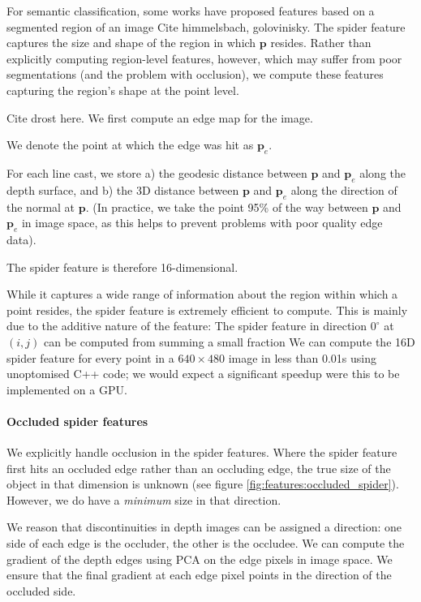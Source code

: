 \documentclass[10pt,twocolumn,letterpaper]{article}
\newcommand{\degree}{^{\circ}}
\newcommand{\point}{\mathbf{p}}
\begin{document}
For semantic classification, some works have proposed features based on a segmented region of an image
Cite himmelsbach, golovinisky.
The spider feature captures the size and shape of the region in which $\point$ resides. 
Rather than explicitly computing region-level features, however, which may suffer from poor segmentations (and the problem with occlusion), we compute these features capturing the region's shape at the point level. 

Cite drost here.
We first compute an edge map for the image.

We denote the point at which the edge was hit as $\point_{e}$.

For each line cast, we store
a) the geodesic distance between $\point$ and $\point_{e}$ along the depth surface, and 
b) the 3D distance between $\point$ and $\point_{e}$ along the direction of the normal at $\point$. (In practice, we take the point 95\% of the way between $\point$ and $\point_{e}$ in image space, as this helps to prevent problems with poor quality edge data).

The spider feature is therefore 16-dimensional.

While it captures a wide range of information about the region within which a point resides, the spider feature is extremely efficient to compute.
This is mainly due to the additive nature of the feature: The spider feature in direction $0\degree$ at $(i, j)$ can be computed from summing a small fraction 
We can compute the 16D spider feature for every point in a $640\times480$ image in less than 0.01s using unoptomised C++ code; we would expect a significant speedup were this to be implemented on a GPU.

\paragraph{Occluded spider features}

We explicitly handle occlusion in the spider features. Where the spider feature first hits an occluded edge rather than an occluding edge, the true size of the object in that dimension is unknown (see figure \ref{fig:features:occluded_spider}).
However, we do have a \textit{minimum} size in that direction.



We reason that discontinuities in depth images can be assigned a direction: one side of each edge is the occluder, the other is the occludee. 
We can compute the gradient of the depth edges using PCA on the edge pixels in image space.
We ensure that the final gradient at each edge pixel points in the direction of the occluded side.
\end{document}
